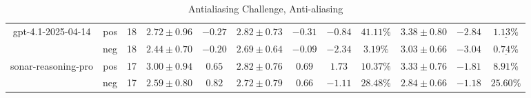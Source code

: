 \begin{table}[ht!]
{\begin{tabular}{| c || c | c || c | c || c | c | c | c || c | c | c ||}
      gpt-4.1-2025-04-14
        & pos
        & 18
        & $2.72 \pm 0.96$
        & $-0.27$
        & $2.82 \pm 0.73$
        & $-0.31$
        & $-0.84$
        & $41.11\text{\%}$
        & $3.38 \pm 0.80$
        & $-2.84$
        & $\underline{\mathbf{1.13\%}}$ \\
        & neg
        & 18
        & $2.44 \pm 0.70$
        & $-0.20$
        & $2.69 \pm 0.64$
        & $-0.09$
        & $-2.34$
        & $3.19\text{\%}$
        & $3.03 \pm 0.66$
        & $-3.04$
        & $\underline{\mathbf{0.74\%}}$ \\
    \hline


      sonar-reasoning-pro
        & pos
        & 17
        & $3.00 \pm 0.94$
        & $0.65$
        & $2.82 \pm 0.76$
        & $0.69$
        & $1.73$
        & $10.37\text{\%}$
        & $3.33 \pm 0.76$
        & $-1.81$
        & $8.91\text{\%}$ \\
        & neg
        & 17
        & $2.59 \pm 0.80$
        & $0.82$
        & $2.72 \pm 0.79$
        & $0.66$
        & $-1.11$
        & $28.48\text{\%}$
        & $2.84 \pm 0.66$
        & $-1.18$
        & $25.60\text{\%}$ \\
    \hline


      \hline
    \end{tabular}
  }
  \caption{Antialiasing Challenge, Anti-aliasing}
  \label{tbleval-distortion-aa_score}
\end{table}


